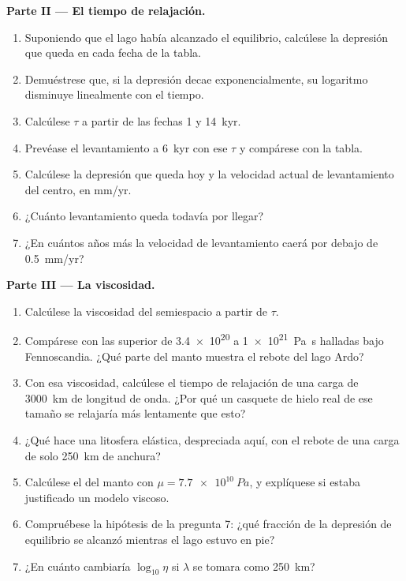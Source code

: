 \begin{problem}
\medskip\noindent\textbf{Parte II --- El tiempo de relajación.}
\begin{enumerate}[resume]
  \item Suponiendo que el lago había alcanzado el equilibrio, calcúlese la depresión que queda
        en cada fecha de la tabla.
  \item Demuéstrese que, si la depresión decae exponencialmente, su logaritmo disminuye
        linealmente con el tiempo.
  \item Calcúlese $\tau$ a partir de las fechas 1 y \qty{14}{kyr}.
  \item Prevéase el levantamiento a \qty{6}{kyr} con ese $\tau$ y compárese con la
        tabla.
  \item Calcúlese la depresión que queda hoy y la velocidad actual de levantamiento del
        centro, en \unit{mm/yr}.
  \item ¿Cuánto levantamiento queda todavía por llegar?
  \item ¿En cuántos años más la velocidad de levantamiento caerá por debajo de
        \qty{0.5}{mm/yr}?
\end{enumerate}

\medskip\noindent\textbf{Parte III --- La viscosidad.}
\begin{enumerate}[resume]
  \item Calcúlese la viscosidad del semiespacio a partir de $\tau$.
  \item Compárese con las  superior de \num{3.4e20} a
        \qty{1e21}{Pa.s} halladas bajo Fennoscandia. ¿Qué parte del manto
        muestra el rebote del lago Ardo?
  \item Con esa viscosidad, calcúlese el tiempo de relajación de una carga
        de \qty{3000}{km} de longitud de onda. ¿Por qué un casquete de hielo real de ese tamaño
        se relajaría más lentamente que esto?
  \item ¿Qué hace una litosfera elástica, despreciada aquí, con el rebote de una
        carga de solo \qty{250}{km} de anchura?
  \item Calcúlese el  del manto con $\mu = \qty{7.7e10}{Pa}$,
        y explíquese si estaba justificado un modelo viscoso.
  \item Compruébese la hipótesis de la pregunta 7: ¿qué fracción de la depresión de equilibrio
        se alcanzó mientras el lago estuvo en pie?
  \item ¿En cuánto cambiaría $\log_{10}\eta$ si $\lambda$ se tomara como
        \qty{250}{km}?
\end{enumerate}


\end{problem}
